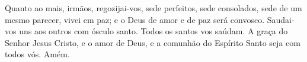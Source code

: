 Quanto ao mais, irmãos, regozijai-vos, sede perfeitos, sede
consolados, sede de um mesmo parecer, vivei em paz; e o Deus de amor
e de paz será convosco. Saudai-vos uns aos outros com ósculo
santo. Todos os santos vos saúdam. A graça do Senhor
Jesus Cristo, e o amor de Deus, e a comunhão do Espírito Santo seja
com todos vós. Amém.

